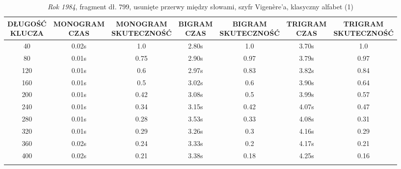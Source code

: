 \documentclass[a4paper]{article}
\theoremstyle{defn}
\theoremstyle{theorem}
\theoremstyle{lemma}
\theoremstyle{cor}
\theoremstyle{fact}
\begin{document}
\begin{center}\begin{small}\begin{longtable}{|c|c|c|c|c|c|c|}
\hline \makecell{DŁUGOŚĆ\\KLUCZA} &  \makecell{MONOGRAM\\CZAS} & \makecell{MONOGRAM\\SKUTECZNOŚĆ} & \makecell{BIGRAM\\CZAS} &  \makecell{BIGRAM\\SKUTECZNOŚĆ} & \makecell{TRIGRAM\\CZAS} & \makecell{TRIGRAM\\SKUTECZNOŚĆ}\\ \hline
40 & 0.02s & 1.0 & 2.80s & 1.0 & 3.70s & 1.0 \\ \hline
80 & 0.01s & 0.75 & 2.90s & 0.97 & 3.79s & 0.97 \\ \hline
120 & 0.01s & 0.6 & 2.97s & 0.83 & 3.82s & 0.84 \\ \hline
160 & 0.01s & 0.5 & 3.02s & 0.6 & 3.90s & 0.64 \\ \hline
200 & 0.01s & 0.42 & 3.08s & 0.5 & 3.99s & 0.57 \\ \hline
240 & 0.01s & 0.34 & 3.15s & 0.42 & 4.07s & 0.47 \\ \hline
280 & 0.01s & 0.28 & 3.53s & 0.33 & 4.08s & 0.31 \\ \hline
320 & 0.01s & 0.29 & 3.26s & 0.3 & 4.16s & 0.29 \\ \hline
360 & 0.02s & 0.24 & 3.33s & 0.2 & 4.17s & 0.21 \\ \hline
400 & 0.02s & 0.21 & 3.38s & 0.18 & 4.25s & 0.16 \\ \hline
\caption{\textit{Rok 1984}, fragment dł. 799, usunięte przerwy między słowami, szyfr Vigenère'a, klasyczny alfabet (1)}
\end{longtable}\end{small}\end{center}
\end{document}

